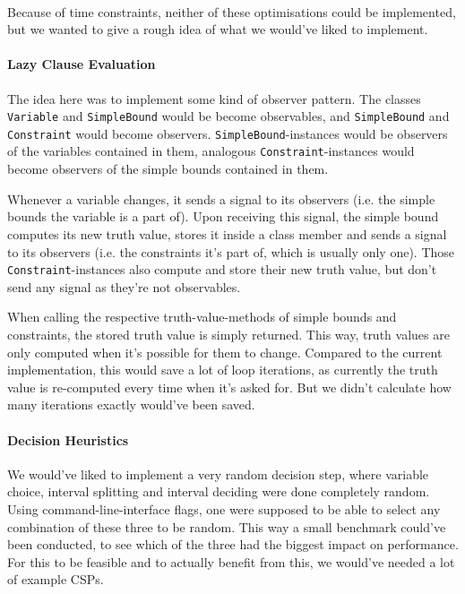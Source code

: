 \paragraph{}
Because of time constraints, neither of these optimisations could be implemented, but we wanted to give a rough idea of what we would've liked to implement.

\paragraph{Lazy Clause Evaluation}
The idea here was to implement some kind of observer pattern.
The classes \texttt{Variable} and \texttt{SimpleBound} would be become observables, and \texttt{SimpleBound} and \texttt{Constraint} would become observers.
\texttt{SimpleBound}-instances would be observers of the variables contained in them, analogous \texttt{Constraint}-instances would become observers of the simple bounds contained in them.

Whenever a variable changes, it sends a signal to its observers (i.e. the simple bounds the variable is a part of).
Upon receiving this signal, the simple bound computes its new truth value, stores it inside a class member and sends a signal to its observers (i.e. the constraints it's part of, which is usually only one).
Those \texttt{Constraint}-instances also compute and store their new truth value, but don't send any signal as they're not observables.

When calling the respective truth-value-methods of simple bounds and constraints, the stored truth value is simply returned.
This way, truth values are only computed when it's possible for them to change.
Compared to the current implementation, this would save a lot of loop iterations, as currently the truth value is re-computed every time when it's asked for.
But we didn't calculate how many iterations exactly would've been saved.


\paragraph{Decision Heuristics}
We would've liked to implement a very random decision step, where variable choice, interval splitting and interval deciding were done completely random.
Using command-line-interface flags, one were supposed to be able to select any combination of these three to be random.
This way a small benchmark could've been conducted, to see which of the three had the biggest impact on performance.
For this to be feasible and to actually benefit from this, we would've needed a lot of example CSPs.
